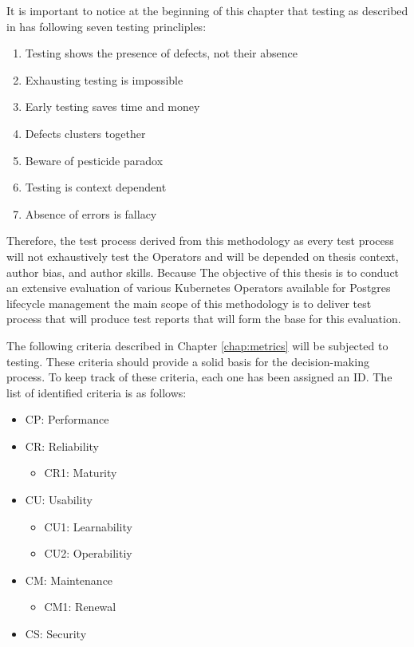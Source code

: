It is important to notice at the beginning of this chapter that testing as described in \cite{FoundationOfSoftwareTesting} has following seven testing princliples:
\begin{enumerate}
    \item Testing shows the presence of defects, not their absence
    \item Exhausting testing is impossible
    \item Early testing saves time and money
    \item Defects clusters together
    \item Beware of pesticide paradox
    \item Testing is context dependent
    \item Absence of errors is fallacy
\end{enumerate}



Therefore, the test process derived from this methodology as every test process will not exhaustively test the Operators and will be depended on thesis context, author bias, and author skills. Because The objective of this thesis is to conduct an extensive evaluation of various Kubernetes
Operators available for Postgres lifecycle management the main scope of this methodology is to deliver test process that will produce test reports that will form the base for this evaluation.

The following criteria described in Chapter \ref{chap:metrics} will be subjected to testing. These criteria should provide a solid basis for the decision-making process. To keep track of these criteria, each one has been assigned an ID. The list of identified criteria is as follows:

\begin{itemize}
    \item	CP: Performance
    \item	CR: Reliability
          \begin{itemize}
              \item	CR1: Maturity
          \end{itemize}
    \item	CU: Usability
          \begin{itemize}
              \item	CU1: Learnability
              \item  CU2: Operabilitiy
          \end{itemize}
    \item	CM: Maintenance
          \begin{itemize}
              \item	CM1: Renewal
          \end{itemize}
    \item	CS: Security
\end{itemize}


